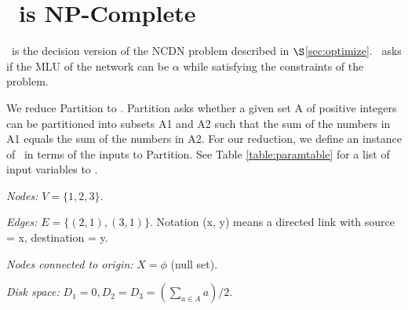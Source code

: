 \eat
{
\section{\optloc\ is NP-Complete}
\label{sec:npcreduction}



\optloc\ is the decision version of the NCDN problem described in $\S$\ref{sec:optimize}.  \optloc\ asks if the MLU of the network can be $\alpha$ while satisfying the constraints of the problem.

We reduce Partition to \optloc. Partition asks whether a given set A of positive integers can be partitioned into  subsets A1 and A2 such that the sum of the numbers in A1 equals the sum of the numbers in A2. For our reduction, we define an instance of  \optloc\ in terms of  the inputs to Partition. See Table \ref{table:paramtable} for a list of input variables to \optloc.









\vsp

\noindent\emph{Nodes:} $V = \{1, 2, 3\}$. 

\vsp

\noindent\emph{Edges:}  $E =  \{ (2, 1) , (3, 1)\}$. Notation (x, y) means a directed link with  source = x,  destination = y.

\vsp

\noindent\emph{Nodes connected to origin:}  $X = \phi$ (null set).

\vsp

\noindent\emph{Disk space:}  $D_1 = 0, D_2 =  D_3 = (\sum_{a \in A} a)/2$.

}
